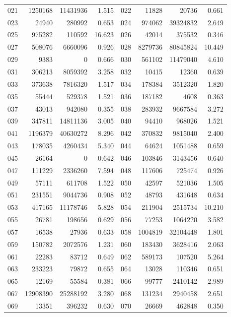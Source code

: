 \begin{longtable}{lrrr@{\hspace{16bp}}lrrr}
021 & 1250168 & 11431936 & 1.515 & 022 & 11828 & 20736 & 0.661\\
023 & 24940 & 280992 & 0.653 & 024 & 974062 & 39324832 & 2.649\\
025 & 975282 & 110592 & 16.623 & 026 & 42014 & 375532 & 0.346\\
027 & 508076 & 6660096 & 0.926 & 028 & 8279736 & 80845824 & 10.449\\
029 & 9383 & 0 & 0.666 & 030 & 561102 & 11479040 & 4.610\\
031 & 306213 & 8059392 & 3.258 & 032 & 10415 & 12360 & 0.639\\
033 & 373638 & 7816320 & 1.517 & 034 & 178384 & 3512320 & 1.820\\
035 & 55444 & 529378 & 1.521 & 036 & 187182 & 4608 & 0.363\\
037 & 43013 & 942080 & 0.355 & 038 & 283932 & 9667584 & 3.272\\
039 & 347811 & 14811136 & 3.005 & 040 & 94410 & 968026 & 1.521\\
041 & 1196379 & 40630272 & 8.296 & 042 & 370832 & 9815040 & 2.400\\
043 & 178035 & 4260434 & 5.340 & 044 & 64624 & 1051488 & 0.659\\
045 & 26164 & 0 & 0.642 & 046 & 103846 & 3143456 & 0.640\\
047 & 111229 & 2336260 & 7.594 & 048 & 117606 & 725474 & 0.926\\
049 & 57111 & 611708 & 1.522 & 050 & 42597 & 521036 & 1.505\\
051 & 231551 & 9044736 & 0.908 & 052 & 48793 & 431648 & 0.634\\
053 & 417165 & 11178746 & 5.828 & 054 & 211904 & 2515734 & 10.210\\
055 & 26781 & 198656 & 0.629 & 056 & 77253 & 1064220 & 3.582\\
057 & 16538 & 27936 & 0.633 & 058 & 1004819 & 32104448 & 1.801\\
059 & 150782 & 2072576 & 1.231 & 060 & 183430 & 3628416 & 2.063\\
061 & 22283 & 83712 & 0.649 & 062 & 589173 & 107520 & 5.264\\
063 & 233223 & 79872 & 0.655 & 064 & 13028 & 110346 & 0.651\\
065 & 12169 & 55584 & 0.381 & 066 & 99777 & 2410142 & 2.989\\
067 & 12908390 & 25288192 & 3.280 & 068 & 131234 & 2940458 & 2.651\\
069 & 13351 & 396232 & 0.630 & 070 & 26669 & 462848 & 0.350\\

\end{longtable}
